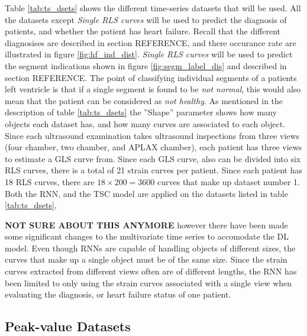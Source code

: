 Table \ref{tab:ts_dsets} shows the different time-series datasets that will be used. 
All the datasets except \textit{Single RLS curves} will be used to predict the diagnosis of patients, and whether the patient has heart failure.
Recall that the different diagnosises are described in section REFERENCE, and there occurance rate are illustrated in figure \ref{fig:hf_ind_dist}.
\textit{Single RLS curves} will be used to predict the segment indications shown in figure \ref{fig:segm_label_dis} and described in section REFERENCE. 
The point of classifying individual segments of a patients left ventricle is that if a single segment is found to be \textit{not normal}, 
this would also mean that the patient can be considered as \textit{not healthy}.
As mentioned in the description of table \ref{tab:ts_dsets} the ''Shape'' parameter shows how many objects each dataset has, and how many curves are associated to each object. 
Since each ultrasound examination takes ultrasound inspections from three views (four chamber, two chamber, and APLAX chamber), each patient has three views to estimate a GLS curve from. 
Since each GLS curve, also can be divided into six RLS curves, there is a total of 21 strain curves per patient. 
Since each patient has 18 RLS curves, there are $18 \times 200 = 3600$ curves that make up dataset number 1.
Both the RNN, and the TSC model are applied on the datasets listed in table \ref{tab:ts_dsets}, 
\bigskip

\textbf{NOT SURE ABOUT THIS ANYMORE}
however there have been made some significant changes to the multivariate time series to accomodate the DL model.
Even though RNNs are capable of handling objects of different sizes, the curves that make up a single object must be of the same size.
Since the strain curves extracted from different views often are of different lengths, the RNN has been limited to only using the strain curves associated with a single view
when evaluating the diagnosis, or heart failure status of one patient.

\subsection{Peak-value Datasets}

